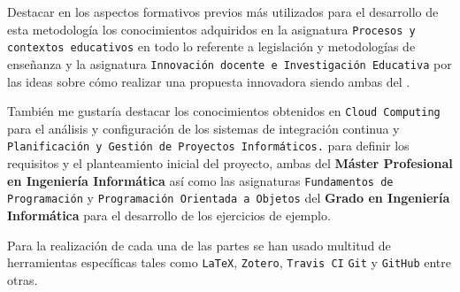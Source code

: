 Destacar en los aspectos formativos previos más utilizados para el desarrollo de esta metodología los conocimientos adquiridos en la asignatura \texttt{Procesos y contextos educativos} en todo lo referente a legislación y metodologías de enseñanza y la asignatura \texttt{Innovación docente e Investigación Educativa} por las ideas sobre cómo realizar una propuesta innovadora siendo ambas del \textbf{\master}.

\bigskip
También me gustaría destacar los conocimientos obtenidos en \texttt{Cloud Computing} para el análisis y configuración de los sistemas de integración continua y \texttt{Planificación y Gestión de Proyectos Informáticos.} para definir los requisitos y el planteamiento inicial del proyecto, ambas del \textbf{Máster Profesional en Ingeniería Informática} así como las asignaturas \texttt{Fundamentos de Programación} y \texttt{Programación Orientada a Objetos} del \textbf{Grado en Ingeniería Informática} para el desarrollo de los ejercicios de ejemplo.

\bigskip
Para la realización de cada una de las partes se han usado multitud de herramientas específicas tales como \texttt{LaTeX}, \texttt{Zotero}, \texttt{Travis CI} \texttt{Git} y \texttt{GitHub} entre otras.
